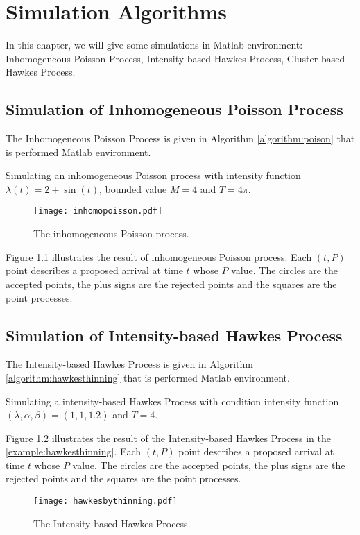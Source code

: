 \chapter{Simulation Algorithms}
\label{chapter:simulation}
In this chapter, we will give some simulations in  Matlab\textsuperscript{\textregistered} environment: Inhomogeneous Poisson Process, Intensity-based Hawkes Process, Cluster-based Hawkes Process.
\section{Simulation of Inhomogeneous Poisson Process}
The Inhomogeneous Poisson Process is given in Algorithm \ref{algorithm:poison} that is performed Matlab\textsuperscript{\textregistered} environment.

\begin{example}
	\label{example:inhomogeneouspoi}
 Simulating an inhomogeneous Poisson process with intensity function $\lambda(t)=2+\sin(t)$, bounded value $M=4$ and $T=4\pi$.
\end{example}
%
\begin{figure}[H]
	\centering
	\texttt{[image: inhomopoisson.pdf]}
	\caption[The inhomogeneous Poisson process.]{The inhomogeneous Poisson process.}
	\label{figure:inhomopoisson}
\end{figure}
Figure \ref{figure:inhomopoisson} illustrates the result of inhomogeneous Poisson process. Each $(t,P)$ point describes a proposed arrival at time $t$ whose $P$ value. The circles are the accepted points, the plus signs are the rejected points and the squares are the point processes.
\section{Simulation of Intensity-based Hawkes Process}
The Intensity-based Hawkes Process is given in Algorithm \ref{algorithm:hawkesthinning} that is performed Matlab\textsuperscript{\textregistered} environment.


\begin{example}
	\label{example:hawkesthinning}
	Simulating a intensity-based Hawkes Process with condition intensity function $(\lambda,\alpha,\beta)=(1,1,1.2)$ and $T=4$.
\end{example}
Figure \ref{figure:hawkesthinning} illustrates the result of the Intensity-based Hawkes Process in the \autoref{example:hawkesthinning}. Each $(t,P)$ point describes a proposed arrival at time $t$ whose $P$ value. The circles are the accepted points, the plus signs are the rejected points and the squares are the point processes.
%
\begin{figure}[H]
	\centering
	\texttt{[image: hawkesbythinning.pdf]}
	\caption[The Intensity-based Hawkes Process.]{The Intensity-based Hawkes Process.}
	\label{figure:hawkesthinning}
\end{figure}
